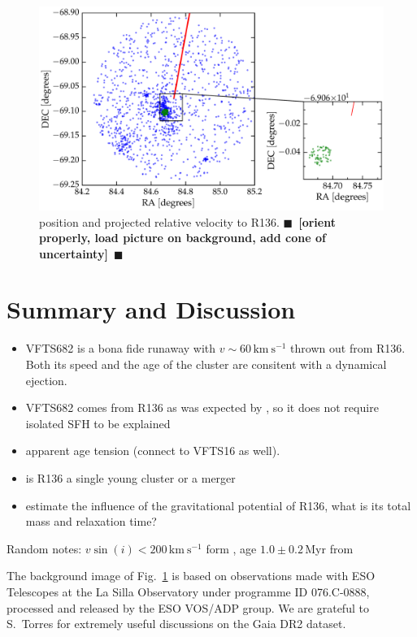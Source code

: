 \documentclass{aa}
\newcommand{\todo}[1]{{\large $\blacksquare$~\textbf{\color{red}[#1]}}~$\blacksquare$}
\DeclareRobustCommand{\Figref}[1]{Fig.~\ref{#1}}
\begin{document}
\begin{figure}[htbp]
  \centering
  \includegraphics[width=\textwidth]{./figures/main_plot}  
  \caption{position and projected relative velocity to
    R136. \todo{orient properly, load  picture on background, add cone of uncertainty}}
  \label{fig:main}
\end{figure}

\section{Summary and Discussion}
\label{sec:discussion}

\begin{itemize}
\item VFTS682 is a bona fide runaway with $v\sim60\,\mathrm{km\
    s^{-1}}$ thrown out from R136. Both its speed and the age of the
  cluster are consitent with a dynamical ejection.
  \item VFTS682 comes from R136 as was expected by
  \cite{bestenlehner:11, fujii:11, banerjee:12}, so it does not
  require isolated SFH to be explained
\item apparent age tension (connect to VFTS16 as well).
\item is R136 a single young cluster or a merger
\item estimate the influence of the gravitational potential of R136,
  what is its total mass and relaxation time?
\end{itemize}

Random notes: $v\sin(i)<200\,\mathrm{km\ s^{-1}}$ form \cite{schneider:18}, age $1.0\pm 0.2$\,Myr
from \cite{schneider:18}




\begin{acknowledgements}
  The background image of \Figref{fig:main} is based on observations made with ESO Telescopes at the La Silla Observatory under programme ID 076.C-0888, processed and released by the ESO VOS/ADP group.
  We are grateful to S.~Torres for extremely useful discussions on the
  Gaia DR2 dataset.
\end{acknowledgements}
\end{document}
